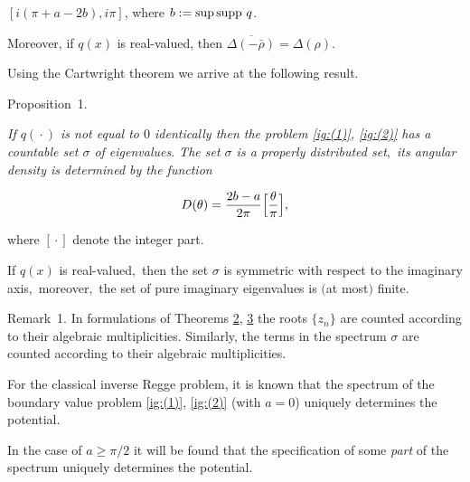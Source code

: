  $[i(\pi+a-2b), i\pi]$, where $b:=\sup  {\rm supp}\ q$.

Moreover, if  $q(x)$ is real-valued, then $\overline{\Delta(-\bar \rho)}=\Delta(\rho)$.



Using the Cartwright theorem we arrive at the following result.



\smallskip



\hypertarget{ign:proposition1}{}



{\small \sc Proposition~1.} {\it If $q({}\cdot{})$ is not equal to $0$ identically then the problem \eqref{ig:(1)}, \eqref{ig:(2)} has a countable set $\sigma$ of eigenvalues$.$ The set $\sigma$ is a properly distributed set$,$ its angular density is  determined by the function 

$$

D(\theta)=\frac{2b-a}{2\pi}\Bigl[\frac{\theta}{\pi}\Bigr] ,

$$

   where $[{}\cdot{}]$ denote the integer part$.$ 

   If $q(x)$ is real-valued$,$ then the set $\sigma$ is symmetric with respect to the imaginary axis$,$ moreover$,$ the set of pure imaginary eigenvalues is $($at most\/$)$ finite$.$

 }



\smallskip



{\small\sc Remark~1.} In formulations of Theorems \hyperlink{ign:th2}{2}, \hyperlink{ign:th3}{3} the roots $\{z_n\}$ are counted according to their algebraic multiplicities. Similarly, the terms in the spectrum $\sigma$ are counted according to their algebraic multiplicities.



\smallskip












For the classical inverse Regge problem, it is known that the spectrum of the boundary value problem \eqref{ig:(1)}, \eqref{ig:(2)}  (with $a=0$) uniquely determines the potential. 

In the case of $a\geq\pi/2$ it will be found that the specification of some {\it part} of the spectrum uniquely determines the potential. 

